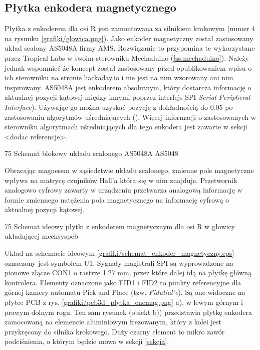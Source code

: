 \subsection{Płytka enkodera magnetycznego}

Płytka z enkoderem dla osi R jest zamontowana za silnikiem krokowym (numer 4 na rysunku \ref{grafiki/glowica.png}). Jako enkoder magnetyczny został zastosowany układ scalony AS5048A firmy AMS. Rozwiązanie to przypomina te wykorzystane przez Tropical Labs w swoim sterowniku Mechaduino (\ref{ss:mechaduino}). Należy jednak wspomnieć że koncept został zastosowany przed opublikowaniem wpisu o ich sterowniku na stronie \url{hackaday.io} i nie jest na nim wzorowany ani nim inspirowany. AS5048A jest enkoderem absolutnym, który dostarcza informację o aktualnej pozycji kątowej między innymi poprzez interfejs SPI {\it Serial Peripheral Interface}). Używając go można uzyskać pozycję z dokładnością do 0.05\degree{} po zastosowaniu algorytmów uśredniających (\cite{AS5048}). Więcej informacji o zastosowanych w sterowniku algorytmach uśredniających dla tego enkodera jest zawarte w sekcji <dodac referencje>.

	{75}
	{Schemat blokowy układu scalonego AS5048A}
	{AS5048}
	
Obracając magnesem w sąsiedztwie układu scalonego, zmienne pole magnetyczne wpływa na matrycę czujników Hall'a która się w nim znajduje. Przetwornik analogowo cyfrowy zawarty w urządzeniu przetwarza analogową informację w formie zmiennego natężenia pola magnetycznego na informację cyfrową o aktualnej pozycji kątowej.

	{75}
	{Schemat ideowy płytki z enkoderem magnetycznym dla osi R w głowicy układającej}
	{mechsyspcb}
	
Układ na schemacie ideowym \ref{grafiki/schemat_enkoder_magnetyczny.eps} oznaczony jest symbolem U1. Sygnały magistrali SPI są wyprowadzone na pionowe złącze CON1 o rastrze 1.27 mm, przez które dalej idą na płytkę główną kontrolera. Elementy oznaczone jako FID1 i FID2 to punkty referencyjne dla górnej kamery automatu Pick and Place (tzw. {\it Fidutial'e}). Są one widoczne na płytce PCB z rys. \ref{grafiki/pcb3d_plytka_encmag.png} a), w lewym górnym i prawym dolnym rogu. Ten sam rysunek (obiekt b)) przedstawia płytkę enkodera zamocowaną na elemencie aluminiowym frezowanym, który z kolei jest przykręcony do silnika krokowego. Duży czarny element to mikro zawór podciśnienia, o którym będzie mowa w sekcji \ref{sekcja}. \\

